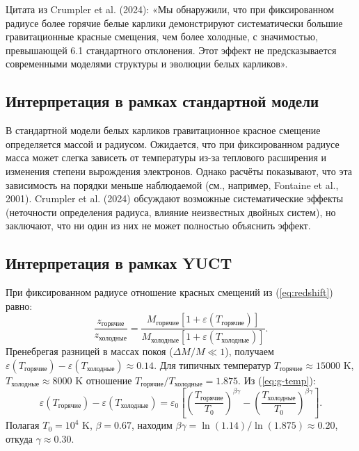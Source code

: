 \documentclass[12pt]{article}
\theoremstyle{remark}
\newcommand{\eps}{\varepsilon}
\begin{document}
	Цитата из Crumpler et al. (2024): «Мы обнаружили, что при фиксированном радиусе более горячие белые карлики демонстрируют систематически большие гравитационные красные смещения, чем более холодные, с значимостью, превышающей 6.1 стандартного отклонения. Этот эффект не предсказывается современными моделями структуры и эволюции белых карликов».
	
	\subsection{Интерпретация в рамках стандартной модели}
	\label{subsec:wd-standard}
	
	В стандартной модели белых карликов гравитационное красное смещение определяется массой и радиусом. Ожидается, что при фиксированном радиусе масса может слегка зависеть от температуры из-за теплового расширения и изменения степени вырождения электронов. Однако расчёты показывают, что эта зависимость на порядки меньше наблюдаемой (см., например, Fontaine et al., 2001). Crumpler et al. (2024) обсуждают возможные систематические эффекты (неточности определения радиуса, влияние неизвестных двойных систем), но заключают, что ни один из них не может полностью объяснить эффект.
	
	\subsection{Интерпретация в рамках YUCT}
	\label{subsec:wd-yuct}
	
	При фиксированном радиусе отношение красных смещений из (\ref{eq:redshift}) равно:
	\begin{equation}
		\frac{z_{\text{горячие}}}{z_{\text{холодные}}} = \frac{M_{\text{горячие}}[1+\eps(T_{\text{горячие}})]}{M_{\text{холодные}}[1+\eps(T_{\text{холодные}})]}.
		\label{eq:redshift-ratio}
	\end{equation}
	Пренебрегая разницей в массах покоя ($\Delta M/M \ll 1$), получаем $\eps(T_{\text{горячие}}) - \eps(T_{\text{холодные}}) \approx 0.14$. Для типичных температур $T_{\text{горячие}} \approx 15000$ K, $T_{\text{холодные}} \approx 8000$ K отношение $T_{\text{горячие}}/T_{\text{холодные}} = 1.875$. Из (\ref{eq:g-temp}):
	\begin{equation}
		\eps(T_{\text{горячие}}) - \eps(T_{\text{холодные}}) = \eps_0 \left[ \left( \frac{T_{\text{горячие}}}{T_0} \right)^{\beta\gamma} - \left( \frac{T_{\text{холодные}}}{T_0} \right)^{\beta\gamma} \right].
		\label{eq:eps-diff}
	\end{equation}
	Полагая $T_0 = 10^4$ K, $\beta = 0.67$, находим $\beta\gamma = \ln(1.14) / \ln(1.875) \approx 0.20$, откуда $\gamma \approx 0.30$.
	
\end{document}
